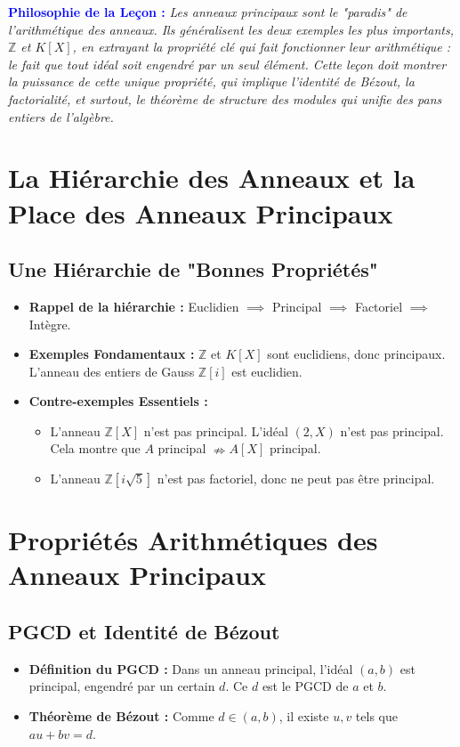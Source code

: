 \documentclass[12pt, a4paper, parskip=full]{report}
\theoremstyle{agregstyle}
\newenvironment{philosophie}
  {\par\medskip\noindent\begin{oframed}\noindent\textbf{\textcolor{blue}{Philosophie de la Leçon :}}\itshape}
  {\end{oframed}\par\medskip}
\begin{document}
\begin{philosophie}
    Les anneaux principaux sont le "paradis" de l'arithmétique des anneaux. Ils généralisent les deux exemples les plus importants, $\mathbb{Z}$ et $K[X]$, en extrayant la propriété clé qui fait fonctionner leur arithmétique : le fait que tout idéal soit engendré par un seul élément. Cette leçon doit montrer la puissance de cette unique propriété, qui implique l'identité de Bézout, la factorialité, et surtout, le théorème de structure des modules qui unifie des pans entiers de l'algèbre.
\end{philosophie}

\section{La Hiérarchie des Anneaux et la Place des Anneaux Principaux}
\subsection{Une Hiérarchie de "Bonnes Propriétés"}
\begin{itemize}
    \item \textbf{Rappel de la hiérarchie :} Euclidien $\implies$ Principal $\implies$ Factoriel $\implies$ Intègre.
    \item \textbf{Exemples Fondamentaux :} $\mathbb{Z}$ et $K[X]$ sont euclidiens, donc principaux. L'anneau des entiers de Gauss $\mathbb{Z}[i]$ est euclidien.
    \item \textbf{Contre-exemples Essentiels :}
        \begin{itemize}
            \item L'anneau $\mathbb{Z}[X]$ n'est pas principal. L'idéal $(2,X)$ n'est pas principal. Cela montre que $A$ principal $\nRightarrow A[X]$ principal.
            \item L'anneau $\mathbb{Z}[i\sqrt{5}]$ n'est pas factoriel, donc ne peut pas être principal.
        \end{itemize}
\end{itemize}

\section{Propriétés Arithmétiques des Anneaux Principaux}
\subsection{PGCD et Identité de Bézout}
\begin{itemize}
    \item \textbf{Définition du PGCD :} Dans un anneau principal, l'idéal $(a,b)$ est principal, engendré par un certain $d$. Ce $d$ est le PGCD de $a$ et $b$.
    \item \textbf{Théorème de Bézout :} Comme $d \in (a,b)$, il existe $u,v$ tels que $au+bv=d$.
\end{itemize}
\end{document}
